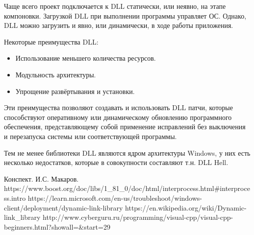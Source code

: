 \documentclass[a4paper,12pt]{article}	%
\begin{document}
	Чаще всего проект подключается к DLL статически, или неявно, на этапе компоновки. Загрузкой DLL при выполнении программы управляет ОС. Однако, DLL можно загрузить и явно, или динамически, в ходе работы приложения.
	
	Некоторые преимущества DLL:
	
	\begin{itemize}

		\item Использование меньшего количества ресурсов.
		
		\item Модульность архитектуры.
		
		\item Упрощение развёртывания и установки.
	
	\end{itemize}

	Эти	преимущества позволяют создавать и использовать DLL патчи, которые способствуют оперативному или динамическому обновлению программного обеспечения, представляющему собой применение исправлений без выключения и перезапуска системы или соответствующей программы.

	Тем не менее библиотеки DLL являются ядром архитектуры Windows, у них есть несколько недостатков, которые в совокупности составляют т.н. DLL Hell.

\newpage

	
 
	\begin{thebibliography}{}
	
		 Конспект. И.С. Макаров.
		 https://www.boost.org/doc/libs/1\_81\_0/doc/html/interprocess.html\#interprocess.intro
		 https://learn.microsoft.com/en-us/troubleshoot/windows-client/deployment/dynamic-link-library
		 https://en.wikipedia.org/wiki/Dynamic-link\_library
		 http://www.cyberguru.ru/programming/visual-cpp/visual-cpp-beginners.html?showall=\&start=29
		
	\end{thebibliography}
\end{document}

